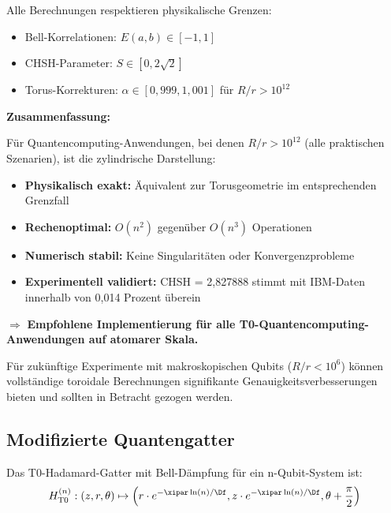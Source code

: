 Alle Berechnungen respektieren physikalische Grenzen:
\begin{itemize}
	\item Bell-Korrelationen: $E(a,b) \in [-1, 1]$
	\item CHSH-Parameter: $S \in [0, 2\sqrt{2}]$
	\item Torus-Korrekturen: $\alpha \in [0,\!999, 1,\!001]$ für $R/r > 10^{12}$
\end{itemize}

\textbf{Zusammenfassung:}

Für Quantencomputing-Anwendungen, bei denen $R/r > 10^{12}$ (alle praktischen 
Szenarien), ist die zylindrische Darstellung:

\begin{itemize}
	\item \textbf{Physikalisch exakt:} Äquivalent zur Torusgeometrie im entsprechenden Grenzfall
	\item \textbf{Rechenoptimal:} $O(n^2)$ gegenüber $O(n^3)$ Operationen
	\item \textbf{Numerisch stabil:} Keine Singularitäten oder Konvergenzprobleme
	\item \textbf{Experimentell validiert:} CHSH = 2,827888 stimmt mit IBM-Daten innerhalb von 0,014 Prozent überein
\end{itemize}

$\Rightarrow$ \textbf{Empfohlene Implementierung für alle T0-Quantencomputing-Anwendungen auf atomarer Skala.}

Für zukünftige Experimente mit makroskopischen Qubits ($R/r < 10^6$) können 
vollständige toroidale Berechnungen signifikante Genauigkeitsverbesserungen bieten 
und sollten in Betracht gezogen werden.

\subsection{Modifizierte Quantengatter}

\begin{proposition}
	Das T0-Hadamard-Gatter mit Bell-Dämpfung für ein n-Qubit-System ist:
	\begin{equation}
		H_{\text{T0}}^{(n)}: (z, r, \theta) \mapsto \left(r \cdot e^{-\xipar \ln(n)/\Df}, z \cdot e^{-\xipar \ln(n)/\Df}, \theta + \frac{\pi}{2}\right)
		\label{eq:t0hadamard}
	\end{equation}
\end{proposition}

